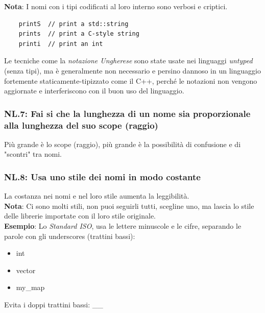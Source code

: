 \textsf{\small \textbf{Nota}: I nomi con i tipi codificati al loro interno sono verbosi e criptici.} \\

\begin{lstlisting}
	printS  // print a std::string
	prints  // print a C-style string
	printi  // print an int
\end{lstlisting}

\textsf{\small Le tecniche come la \emph{notazione Ungherese} sono state usate nei linguaggi \emph{untyped} (senza tipi), ma è generalmente non necessario e persino dannoso in un linguaggio fortemente staticamente-tipizzato come il C++, perché le notazioni non vengono aggiornate e interferiscono con il buon uso del linguaggio.} \\

\subsubsection{NL.7: Fai si che la lunghezza di un nome sia proporzionale alla lunghezza del suo scope (raggio)}

\textsf{\small Più grande è lo scope (raggio), più grande è la possibilità di confusione e di "scontri" tra nomi.} \\

\subsubsection{NL.8: Usa uno stile dei nomi in modo costante}

\textsf{\small La costanza nei nomi e nel loro stile aumenta la leggibilità.} \\

\textsf{\small \textbf{Nota}: Ci sono molti stili, non puoi seguirli tutti, scegline uno, ma lascia lo stile delle librerie importate con il loro stile originale.} \\

\textsf{\small \textbf{Esempio}: Lo \emph{Standard ISO}, usa le lettere minuscole e le cifre, separando le parole con gli underscores (trattini bassi):}

\begin{itemize}
	\item \textsf{\small int}
	\item \textsf{\small vector}
	\item \textsf{\small my\_map}
\end{itemize}

\textsf{\small Evita i doppi trattini bassi: \_\_} \\

